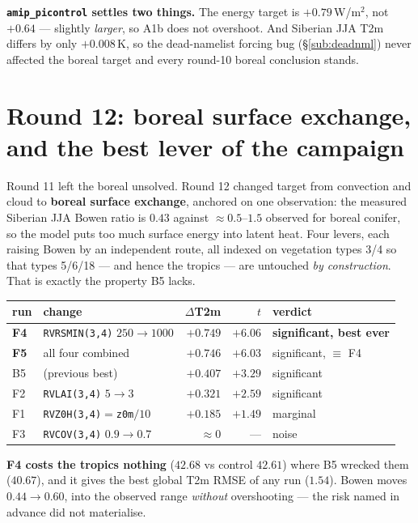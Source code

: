 \documentclass[10pt]{article}
\begin{document}
\textbf{\texttt{amip\_picontrol} settles two things.} The energy target is $+0.79$\,W/m$^2$,
not $+0.64$ --- slightly \emph{larger}, so A1b does not overshoot. And Siberian JJA T2m differs
by only $+0.008$\,K, so the dead-namelist forcing bug (\S\ref{sub:deadnml}) never affected the
boreal target and every round-10 boreal conclusion stands.

\section{Round 12: boreal surface exchange, and the best lever of the campaign}\label{sec:round12}
Round 11 left the boreal unsolved. Round 12 changed target from convection and cloud to
\textbf{boreal surface exchange}, anchored on one observation: the measured Siberian JJA Bowen
ratio is $\mathbf{0.43}$ against $\approx0.5$--$1.5$ observed for boreal conifer, so the model
puts too much surface energy into latent heat. Four levers, each raising Bowen by an
independent route, all indexed on vegetation types 3/4 so that types 5/6/18 --- and hence the
tropics --- are untouched \emph{by construction}. That is exactly the property B5 lacks.

\begin{center}\footnotesize
\begin{tabular}{l l r r l}
\toprule
run & change & $\Delta$T2m & $t$ & verdict \\
\midrule
\textbf{F4} & \texttt{RVRSMIN(3,4)} $250\to1000$ & $\mathbf{+0.749}$ & $+6.06$ & \textbf{significant, best ever} \\
\textbf{F5} & all four combined                  & $\mathbf{+0.746}$ & $+6.03$ & significant, $\equiv$ F4 \\
B5          & (previous best)                    & $+0.407$ & $+3.29$ & significant \\
F2          & \texttt{RVLAI(3,4)} $5\to3$        & $+0.321$ & $+2.59$ & significant \\
F1          & \texttt{RVZ0H(3,4)}$=$\texttt{z0m}$/10$ & $+0.185$ & $+1.49$ & marginal \\
F3          & \texttt{RVCOV(3,4)} $0.9\to0.7$    & $\approx0$ & --- & noise \\
\bottomrule
\end{tabular}
\end{center}

\noindent\textbf{F4 costs the tropics nothing} ($42.68$ vs control $42.61$) where B5 wrecked
them ($40.67$), and it gives the best global T2m RMSE of any run ($1.54$). Bowen moves
$0.44\to0.60$, into the observed range \emph{without} overshooting --- the risk named in
advance did not materialise.
\end{document}
